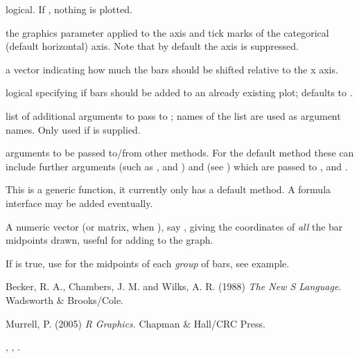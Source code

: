 \begin{Arguments}
\begin{ldescription}
\item[\code{plot}] logical.  If , nothing is plotted.
\item[\code{axis.lty}] the graphics parameter  applied to the axis
and tick marks of the categorical (default horizontal) axis.  Note
that by default the axis is suppressed.
\item[\code{offset}] a vector indicating how much the bars should be shifted
relative to the x axis.
\item[\code{add}] logical specifying if bars should be added to an already
existing plot; defaults to .
\item[\code{args.legend}] list of additional arguments to pass to
; names of the list are used as argument
names.  Only used if  is supplied.
\item[\code{...}] arguments to be passed to/from other methods.  For the
default method these can include further arguments (such as
,  and ) and
 (see ) which are passed to
,  and
.
\end{ldescription}
\end{Arguments}
%
\begin{Details}\relax
This is a generic function, it currently only has a default method.
A formula interface may be added eventually.
\end{Details}
%
\begin{Value}
A numeric vector (or matrix, when ), say
, giving the coordinates of \emph{all} the bar midpoints
drawn, useful for adding to the graph.

If  is true, use  for the
midpoints of each \emph{group} of bars, see example.
\end{Value}
%
\begin{References}\relax
Becker, R. A., Chambers, J. M. and Wilks, A. R. (1988)
\emph{The New S Language}.
Wadsworth \& Brooks/Cole.

Murrell, P. (2005) \emph{R Graphics}. Chapman \& Hall/CRC Press.
\end{References}
%
\begin{SeeAlso}\relax
{}, ,
.
\end{SeeAlso}
